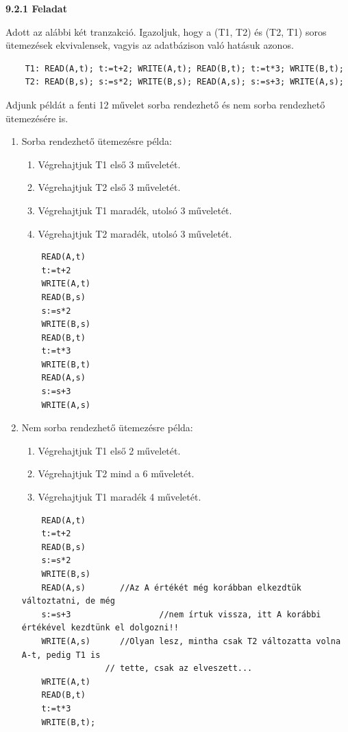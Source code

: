 \documentclass[a4paper,11.5pt, table]{article}
\begin{document}
	\textbf{9.2.1 Feladat}
	
	Adott az alábbi két tranzakció. Igazoljuk, hogy a (T1, T2) és (T2, T1) soros ütemezések ekvivalensek, vagyis az adatbázison való hatásuk azonos.
	\begin{lstlisting}
	T1: READ(A,t); t:=t+2; WRITE(A,t); READ(B,t); t:=t*3; WRITE(B,t);
	T2: READ(B,s); s:=s*2; WRITE(B,s); READ(A,s); s:=s+3; WRITE(A,s);
	\end{lstlisting}
	Adjunk példát a fenti 12 művelet sorba rendezhető és nem sorba rendezhető ütemezésére is.
	\begin{enumerate}[label = \alph*)]
		\item Sorba rendezhető ütemezésre példa:
		\begin{enumerate}
			\item Végrehajtjuk T1 első 3 műveletét.
			\item Végrehajtjuk T2 első 3 műveletét.
			\item Végrehajtjuk T1 maradék, utolsó 3 műveletét.
			\item Végrehajtjuk T2 maradék, utolsó 3 műveletét.
		\end{enumerate}
		
		\begin{lstlisting}
	READ(A,t) 
	t:=t+2
	WRITE(A,t)
	READ(B,s)
	s:=s*2
	WRITE(B,s)
	READ(B,t)
	t:=t*3
	WRITE(B,t)
	READ(A,s)
	s:=s+3
	WRITE(A,s)
		\end{lstlisting}
	
	
		\item Nem sorba rendezhető ütemezésre példa:
		\begin{enumerate}
			\item Végrehajtjuk T1 első 2 műveletét.
			\item Végrehajtjuk T2 mind a 6 műveletét.
			\item Végrehajtjuk T1 maradék 4 műveletét.
		\end{enumerate}
		\begin{lstlisting}
	READ(A,t)  
	t:=t+2
	READ(B,s)
	s:=s*2
	WRITE(B,s)
	READ(A,s) 		//Az A értékét még korábban elkezdtük változtatni, de még 
	s:=s+3 					//nem írtuk vissza, itt A korábbi értékével kezdtünk el dolgozni!!
	WRITE(A,s)		//Olyan lesz, mintha csak T2 változatta volna A-t, pedig T1 is
				 //	tette, csak az elveszett...
	WRITE(A,t)
	READ(B,t)
	t:=t*3
	WRITE(B,t);
		\end{lstlisting}
	\end{enumerate} 
\end{document}
